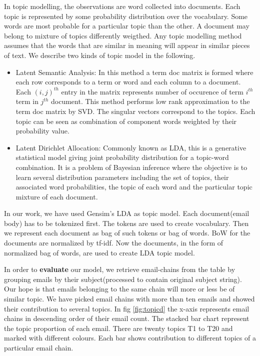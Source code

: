 \documentclass{article} %
\begin{document}
In topic modelling, the observations are word collected into documents. Each topic is represented by some probability distribution over the vocabulary. Some words are most probable for a particular topic than the other. A document may belong to mixture of topics differently weigthed. Any topic modelling method assumes that the words that are similar in meaning will appear in similar pieces of text. We describe two kinds of topic model in the following.
\begin{itemize}
\item Latent Semantic Analysis: In this method a term doc matrix is formed where each row corresponds to a term or word and each column to a document. Each $(i,j)^{th}$ entry in the matrix represents number of occurence of term $i^{th}$ term in $j^{th}$ document. This method performs low rank approximation to the term doc matrix by SVD. The singular vectors correspond to the topics. Each topic can be seen as combination of component words weighted by their probability value.
\item Latent Dirichlet Allocation: Commonly known as LDA, this is a generative statistical model giving joint probability distribution for a topic-word combination. It is a problem of Bayesian inference where the objective is to learn several distribution parameters including the set of topics, their associated word probabilities, the topic of each word and the particular topic mixture of each document.
\end{itemize}

In our work, we have used Gensim's LDA as topic model. Each document(email body) has to be tokenized first. The tokens are used to create vocabulary. Then we represent each document as bag of such tokens or bag of words. BoW for the documents are normalized by tf-idf. Now the documents, in the form of normalized bag of words, are used to create LDA topic model.

In order to \textbf{evaluate} our model, we retrieve email-chains from the table by grouping emails by their subject(processed to contain original subject string). Our hope is that emails belonging to the same chain will more or less be of similar topic. We have picked email chains with more than ten emails and showed their contribution to several topics. In fig \ref{fig:topicd} the x-axis represents email chains in descending order of their email count. The stacked bar chart represent the topic proportion of each email. There are twenty topics T1 to T20 and marked with different colours. Each bar shows contribution to different topics of a particular email chain.
\end{document}

